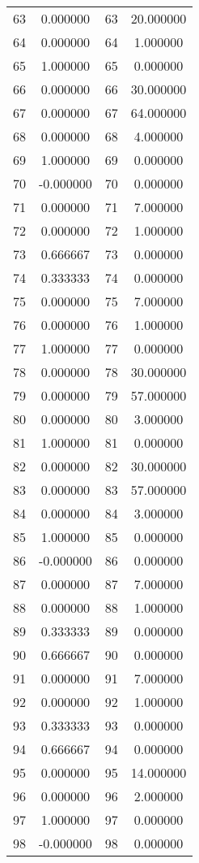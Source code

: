 \documentclass[12pt]{article}
\begin{document}
\begin{longtable}{@{}cccc@{}}
63 & 0.000000 & 63 & 20.000000 \\
64 & 0.000000 & 64 & 1.000000 \\
65 & 1.000000 & 65 & 0.000000 \\
66 & 0.000000 & 66 & 30.000000 \\
67 & 0.000000 & 67 & 64.000000 \\
68 & 0.000000 & 68 & 4.000000 \\
69 & 1.000000 & 69 & 0.000000 \\
70 & -0.000000 & 70 & 0.000000 \\
71 & 0.000000 & 71 & 7.000000 \\
72 & 0.000000 & 72 & 1.000000 \\
73 & 0.666667 & 73 & 0.000000 \\
74 & 0.333333 & 74 & 0.000000 \\
75 & 0.000000 & 75 & 7.000000 \\
76 & 0.000000 & 76 & 1.000000 \\
77 & 1.000000 & 77 & 0.000000 \\
78 & 0.000000 & 78 & 30.000000 \\
79 & 0.000000 & 79 & 57.000000 \\
80 & 0.000000 & 80 & 3.000000 \\
81 & 1.000000 & 81 & 0.000000 \\
82 & 0.000000 & 82 & 30.000000 \\
83 & 0.000000 & 83 & 57.000000 \\
84 & 0.000000 & 84 & 3.000000 \\
85 & 1.000000 & 85 & 0.000000 \\
86 & -0.000000 & 86 & 0.000000 \\
87 & 0.000000 & 87 & 7.000000 \\
88 & 0.000000 & 88 & 1.000000 \\
89 & 0.333333 & 89 & 0.000000 \\
90 & 0.666667 & 90 & 0.000000 \\
91 & 0.000000 & 91 & 7.000000 \\
92 & 0.000000 & 92 & 1.000000 \\
93 & 0.333333 & 93 & 0.000000 \\
94 & 0.666667 & 94 & 0.000000 \\
95 & 0.000000 & 95 & 14.000000 \\
96 & 0.000000 & 96 & 2.000000 \\
97 & 1.000000 & 97 & 0.000000 \\
98 & -0.000000 & 98 & 0.000000 \\

\end{longtable}
\end{document}
